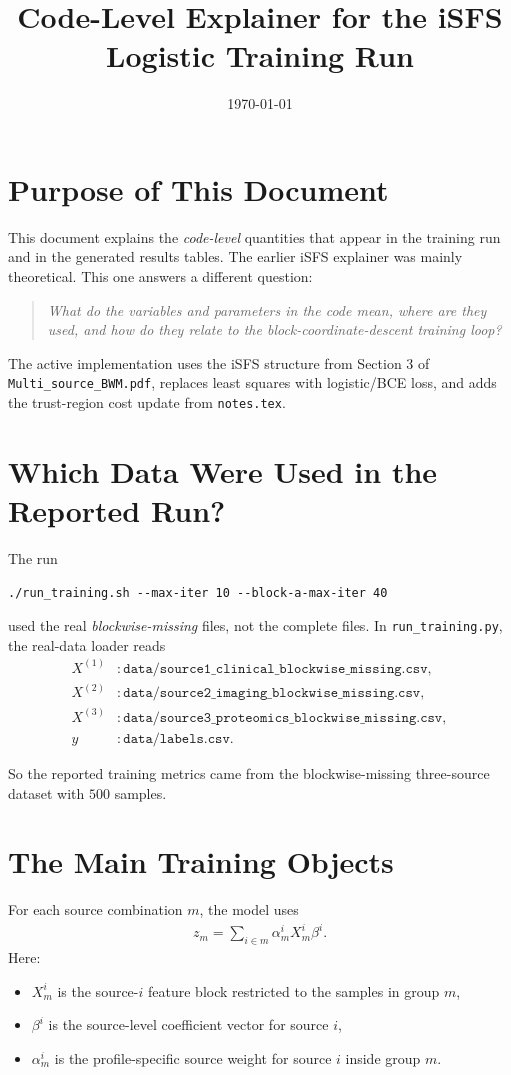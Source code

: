 \documentclass[11pt]{article}
\title{Code-Level Explainer for the iSFS Logistic Training Run}
\author{}
\date{\today}
\begin{document}
\maketitle

\section{Purpose of This Document}
This document explains the \emph{code-level} quantities that appear in the
training run and in the generated results tables. The earlier iSFS explainer was
mainly theoretical. This one answers a different question:
\begin{quote}
\emph{What do the variables and parameters in the code mean, where are they
used, and how do they relate to the block-coordinate-descent training loop?}
\end{quote}

The active implementation uses the iSFS structure from Section 3 of
\texttt{Multi\_source\_BWM.pdf}, replaces least squares with logistic/BCE loss,
and adds the trust-region cost update from \texttt{notes.tex}.

\section{Which Data Were Used in the Reported Run?}
The run
\begin{verbatim}
./run_training.sh --max-iter 10 --block-a-max-iter 40
\end{verbatim}
used the real \emph{blockwise-missing} files, not the complete files. In
\texttt{run\_training.py}, the real-data loader reads
\begin{align*}
X^{(1)} &: \texttt{data/source1\_clinical\_blockwise\_missing.csv}, \\
X^{(2)} &: \texttt{data/source2\_imaging\_blockwise\_missing.csv}, \\
X^{(3)} &: \texttt{data/source3\_proteomics\_blockwise\_missing.csv}, \\
y &: \texttt{data/labels.csv}.
\end{align*}

So the reported training metrics came from the blockwise-missing three-source
dataset with $500$ samples.

\section{The Main Training Objects}
For each source combination $m$, the model uses
\begin{align}
z_m = \sum_{i \in m} \alpha_m^i X_m^i \beta^i.
\end{align}
Here:
\begin{itemize}
\item $X_m^i$ is the source-$i$ feature block restricted to the samples in group
$m$,
\item $\beta^i$ is the source-level coefficient vector for source $i$,
\item $\alpha_m^i$ is the profile-specific source weight for source $i$ inside
group $m$.
\end{itemize}
\end{document}
